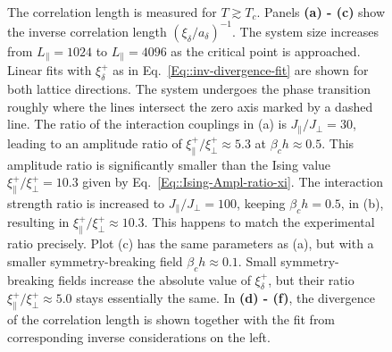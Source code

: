 	\begin{figure}[htp]
		\begin{subfigure}{0.475\textwidth}
			\centering
			
		\end{subfigure}
		\begin{subfigure}{0.48\textwidth}
			\centering
			
		\end{subfigure} \\ 
		\begin{subfigure}{0.475\textwidth}
			\centering			
		\end{subfigure}
		\begin{subfigure}{0.475\textwidth}
			\centering			
		\end{subfigure} \\ 
		\begin{subfigure}{0.475\textwidth}
			\centering		
		\end{subfigure}
		\begin{subfigure}{0.475\textwidth}
			\centering
			
		\end{subfigure} \\ \par\bigskip
		\caption{The correlation length is measured for $T \gtrsim T_c$. Panels \textbf{(a) - (c)}  show the inverse correlation length $(\xi_\delta /	a_\delta)^{-1}$. The system size increases from $L_\parallel =	1024$ to $L_\parallel =	4096$ as the critical point is approached. Linear fits with $\xi_\delta^+$ as in Eq.~\eqref{Eq::inv-divergence-fit} are shown for both lattice directions. The system undergoes the phase transition roughly where the lines intersect the zero axis marked by a dashed line. The ratio of the interaction couplings in (a) is $ J_\parallel /	J_\perp =	30$, leading to an amplitude ratio of $\xi_{\parallel}^+ /	\xi_\perp^+  \approx  5.3$ at $\beta_c h \approx 0.5$. This amplitude ratio is significantly smaller than the Ising value $\xi_{\parallel}^+ /	\xi_\perp^+ =	10.3$ given by Eq.~\eqref{Eq::Ising-Ampl-ratio-xi}. The interaction strength ratio is increased to $ J_\parallel /	J_\perp =	100$, keeping $ \beta_c h =	0.5$, in (b), resulting in  $\xi_{\parallel}^+ /	\xi_\perp^+  \approx  10.3$. This happens to match the experimental ratio precisely. Plot (c) has the same parameters as (a), but with a smaller symmetry-breaking field $\beta_c h\approx 0.1$. Small symmetry-breaking fields increase the absolute value of $\xi_\delta^+$, but their ratio  $\xi_{\parallel}^+ /	\xi_\perp^+  \approx  5.0$ stays essentially the same. In \textbf{(d) - (f)}, the divergence of the correlation length is shown together with the fit from corresponding inverse considerations on the left.}
		\label{Fig::Amplitude-Result}
	\end{figure}	
